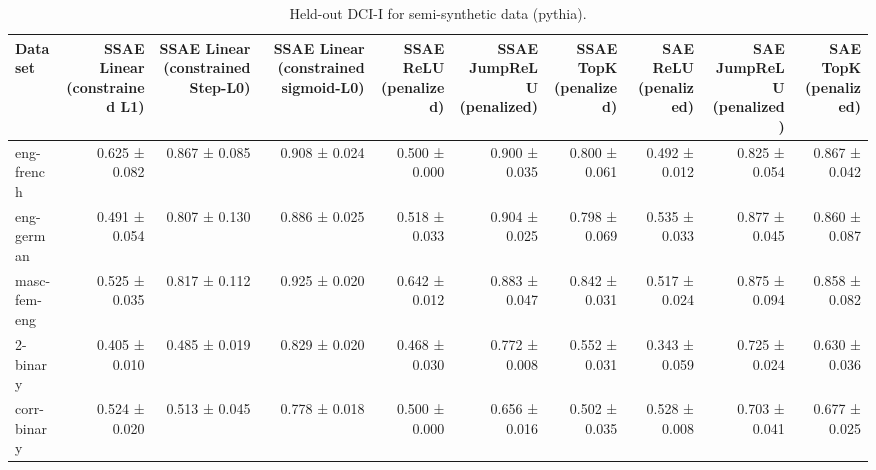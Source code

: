 \begin{table}[t]
\centering
\caption{Held-out DCI-I for semi-synthetic data (pythia).}
\label{tab:semisynthetic-pythia-dci-i}
\begin{tabular}{lrrrrrrrrr}
\toprule
Dataset & SSAE Linear (constrained L1) & SSAE Linear (constrained Step-L0) & SSAE Linear (constrained sigmoid-L0) & SSAE ReLU (penalized) & SSAE JumpReLU (penalized) & SSAE TopK (penalized) & SAE ReLU (penalized) & SAE JumpReLU (penalized) & SAE TopK (penalized) \\
\midrule
eng-french & 0.625 ± 0.082 & 0.867 ± 0.085 & 0.908 ± 0.024 & 0.500 ± 0.000 & 0.900 ± 0.035 & 0.800 ± 0.061 & 0.492 ± 0.012 & 0.825 ± 0.054 & 0.867 ± 0.042 \\
eng-german & 0.491 ± 0.054 & 0.807 ± 0.130 & 0.886 ± 0.025 & 0.518 ± 0.033 & 0.904 ± 0.025 & 0.798 ± 0.069 & 0.535 ± 0.033 & 0.877 ± 0.045 & 0.860 ± 0.087 \\
masc-fem-eng & 0.525 ± 0.035 & 0.817 ± 0.112 & 0.925 ± 0.020 & 0.642 ± 0.012 & 0.883 ± 0.047 & 0.842 ± 0.031 & 0.517 ± 0.024 & 0.875 ± 0.094 & 0.858 ± 0.082 \\
2-binary & 0.405 ± 0.010 & 0.485 ± 0.019 & 0.829 ± 0.020 & 0.468 ± 0.030 & 0.772 ± 0.008 & 0.552 ± 0.031 & 0.343 ± 0.059 & 0.725 ± 0.024 & 0.630 ± 0.036 \\
corr-binary & 0.524 ± 0.020 & 0.513 ± 0.045 & 0.778 ± 0.018 & 0.500 ± 0.000 & 0.656 ± 0.016 & 0.502 ± 0.035 & 0.528 ± 0.008 & 0.703 ± 0.041 & 0.677 ± 0.025 \\
\bottomrule
\end{tabular}
\end{table}
